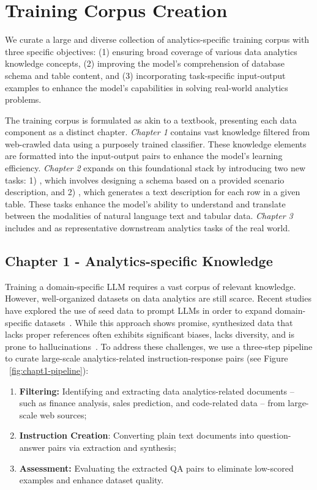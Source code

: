 \section{Training Corpus Creation}\label{sec:data_curation}
We curate a large and diverse collection of analytics-specific training corpus with three specific objectives: (1) ensuring broad coverage of various data analytics knowledge concepts, (2) improving the model's comprehension of database schema and table content, and (3) incorporating task-specific input-output examples to enhance the model's capabilities in solving real-world analytics problems.

The training corpus is formulated as akin to a textbook, presenting each data component as a distinct chapter. 
%
\emph{Chapter 1} contains vast knowledge filtered from web-crawled data using a purposely trained classifier. These knowledge elements are formatted into the input-output pairs to enhance the model’s learning efficiency.
%
\emph{Chapter 2} expands on this foundational stack by introducing two new tasks: 1) \texttotable, which involves designing a schema based on a provided scenario description, and 2) \tabletotext, which generates a text description for each row in a given table. These tasks enhance the model's ability to understand and translate between the modalities of natural language text and tabular data.
%
\emph{Chapter 3} includes \datadiscovery and
\texttosql as representative downstream analytics tasks of the real world.


\subsection{Chapter 1 - Analytics-specific Knowledge} 
\label{sec:chapter1}

Training a domain-specific LLM requires a vast corpus of relevant knowledge. However, well-organized datasets on data analytics are still scarce. Recent studies have explored the use of seed data to prompt LLMs in order to expand domain-specific datasets~\citep{amini2019mathqa,zhou2024llm,yumetamath}. While this approach shows promise, synthesized data that lacks proper references often exhibits significant biases, lacks diversity, and is prone to hallucinations~\cite {yue2024mammoth2}.
%
To address these challenges, we use a three-step pipeline to curate large-scale analytics-related instruction-response pairs (see Figure ~\ref{fig:chapt1-pipeline}): 
\begin{enumerate}
    \item \textbf{Filtering:} Identifying and extracting data analytics-related documents -- such as finance analysis, sales prediction, and code-related data -- from large-scale web sources;
    \item \textbf{Instruction Creation}: Converting  plain text documents into question-answer pairs via extraction and synthesis;
    \item \textbf{Assessment:} Evaluating the extracted QA pairs to eliminate low-scored examples and enhance dataset quality.
\end{enumerate}

